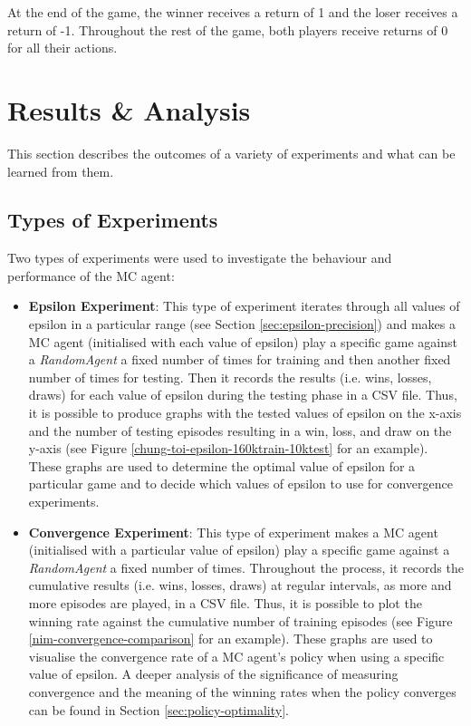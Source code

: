 \documentclass[11pt,a4paper,twoside,openright]{report}
\begin{document}
At the end of the game, the winner receives a return of 1 and the loser receives a return of -1. Throughout the rest of the game, both players receive returns of 0 for all their actions.


\chapter{Results \& Analysis}

This section describes the outcomes of a variety of experiments and what can be learned from them.


\section{Types of Experiments}
\label{sec:experiment-types}

Two types of experiments were used to investigate the behaviour and performance of the MC agent:

\begin{itemize}

	\item \textbf{Epsilon Experiment}: This type of experiment iterates through all values of epsilon in a particular range (see Section \ref{sec:epsilon-precision}) and makes a MC agent (initialised with each value of epsilon) play a specific game against a \emph{RandomAgent} a fixed number of times for training and then another fixed number of times for testing. Then it records the results (i.e. wins, losses, draws) for each value of epsilon during the testing phase in a CSV file. Thus, it is possible to produce graphs with the tested values of epsilon on the x-axis and the number of testing episodes resulting in a win, loss, and draw on the y-axis (see Figure \ref{chung-toi-epsilon-160ktrain-10ktest} for an example). These graphs are used to determine the optimal value of epsilon for a particular game and to decide which values of epsilon to use for convergence experiments.

	\item \textbf{Convergence Experiment}: This type of experiment makes a MC agent (initialised with a particular value of epsilon) play a specific game against a \emph{RandomAgent} a fixed number of times. Throughout the process, it records the cumulative results (i.e. wins, losses, draws) at regular intervals, as more and more episodes are played, in a CSV file. Thus, it is possible to plot the winning rate against the cumulative number of training episodes (see Figure \ref{nim-convergence-comparison} for an example). These graphs are used to visualise the convergence rate of a MC agent's policy when using a specific value of epsilon. A deeper analysis of the significance of measuring convergence and the meaning of the winning rates when the policy converges can be found in Section \ref{sec:policy-optimality}.

\end{itemize}
\end{document}
